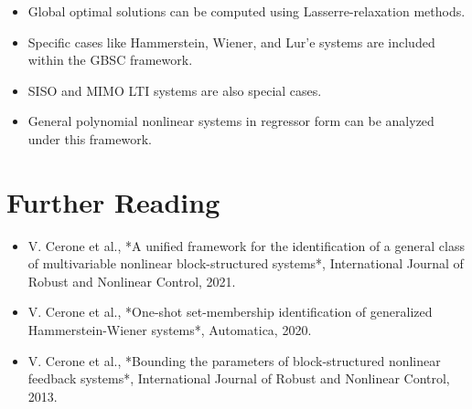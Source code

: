 \begin{itemize}
    \item Global optimal solutions can be computed using Lasserre-relaxation methods.
    \item Specific cases like Hammerstein, Wiener, and Lur’e systems are included within the GBSC framework.
    \item SISO and MIMO LTI systems are also special cases.
    \item General polynomial nonlinear systems in regressor form can be analyzed under this framework.
\end{itemize}

\section*{Further Reading}

\begin{itemize}
    \item V. Cerone et al., *A unified framework for the identification of a general class of multivariable nonlinear block-structured systems*, International Journal of Robust and Nonlinear Control, 2021.
    \item V. Cerone et al., *One-shot set-membership identification of generalized Hammerstein-Wiener systems*, Automatica, 2020.
    \item V. Cerone et al., *Bounding the parameters of block-structured nonlinear feedback systems*, International Journal of Robust and Nonlinear Control, 2013.
\end{itemize}